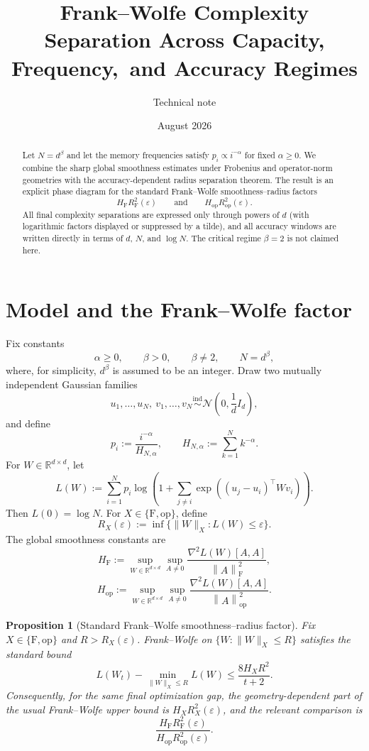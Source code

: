 \documentclass[11pt]{article}
\title{Frank--Wolfe Complexity Separation Across Capacity, Frequency,\
and Accuracy Regimes}
\author{Technical note}
\date{August 2026}
\newtheorem{proposition}[theorem]{Proposition}
\newcommand{\R}{\mathbb R}
\newcommand{\eps}{\varepsilon}
\newcommand{\RF}{R_{\mathrm F}}
\newcommand{\Rop}{R_{\mathrm{op}}}
\newcommand{\HF}{H_{\mathrm F}}
\newcommand{\Hop}{H_{\mathrm{op}}}
\newcommand{\normF}[1]{\left\lVert #1\right\rVert_{\mathrm F}}
\newcommand{\normop}[1]{\left\lVert #1\right\rVert_{\mathrm{op}}}
\begin{document}
\maketitle

\begin{abstract}
Let $N=d^\beta$ and let the memory frequencies satisfy
$p_i\propto i^{-\alpha}$ for fixed $\alpha\geq0$.  We combine the
sharp global smoothness estimates under Frobenius and operator-norm
geometries with the accuracy-dependent radius separation theorem.  The
result is an explicit phase diagram for the standard Frank--Wolfe
smoothness--radius factors
\[
 \HF\RF^2(\eps)
 \qquad\text{and}\qquad
 \Hop\Rop^2(\eps).
\]
All final complexity separations are expressed only through powers of
$d$ (with logarithmic factors displayed or suppressed by a tilde), and
all accuracy windows are written directly in terms of $d$, $N$, and
$\log N$.  The critical regime $\beta=2$ is not claimed here.
\end{abstract}

\section{Model and the Frank--Wolfe factor}

Fix constants
\[
 \alpha\geq0,
 \qquad
 \beta>0,
 \qquad
 \beta\neq2,
 \qquad
 N=d^\beta,
\]
where, for simplicity, $d^\beta$ is assumed to be an integer.  Draw two
mutually independent Gaussian families
\[
 u_1,\ldots,u_N,
 \ v_1,\ldots,v_N
 \overset{\mathrm{ind}}{\sim}
 \mathcal N\!\left(0,\frac1d I_d\right),
\]
and define
\[
 p_i:=\frac{i^{-\alpha}}{H_{N,\alpha}},
 \qquad
 H_{N,\alpha}:=\sum_{k=1}^N k^{-\alpha}.
\]
For $W\in\R^{d\times d}$, let
\[
 L(W)
 :=
 \sum_{i=1}^N p_i
 \log\!\left(
 1+\sum_{j\neq i}
 \exp\!\left((u_j-u_i)^\top Wv_i\right)
 \right).
\]
Then $L(0)=\log N$.  For $X\in\{\mathrm F,\mathrm{op}\}$, define
\[
 R_X(\eps)
 :=
 \inf\bigl\{\|W\|_X:L(W)\leq\eps\bigr\}.
\]
The global smoothness constants are
\[
 \HF
 :=
 \sup_{W\in\R^{d\times d}}
 \sup_{A\neq0}
 \frac{\nabla^2L(W)[A,A]}{\normF{A}^2},
\]
\[
 \Hop
 :=
 \sup_{W\in\R^{d\times d}}
 \sup_{A\neq0}
 \frac{\nabla^2L(W)[A,A]}{\normop{A}^2}.
\]

\begin{proposition}[Standard Frank--Wolfe smoothness--radius factor]
\label{prop:fw-factor}
Fix $X\in\{\mathrm F,\mathrm{op}\}$ and $R>R_X(\eps)$.  Frank--Wolfe on
$\{W:\|W\|_X\leq R\}$ satisfies the standard bound
\[
 L(W_t)-\min_{\|W\|_X\leq R}L(W)
 \leq
 \frac{8H_XR^2}{t+2}.
\]
Consequently, for the same final optimization gap, the geometry-dependent
part of the usual Frank--Wolfe upper bound is $H_XR_X^2(\eps)$, and the
relevant comparison is
\begin{equation}
 \frac{\HF\RF^2(\eps)}{\Hop\Rop^2(\eps)}.
 \label{eq:fw-ratio}
\end{equation}
\end{proposition}
\end{document}
